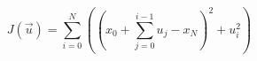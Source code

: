 \documentclass{article}
\begin{document}
\thispagestyle{empty}

$$
J(\vec{u}) = \sum\limits_{i=0}^N \left(\left(x_0+\sum\limits_{j=0}^{i-1}u_j-x_N\right)^2 + u_i^2\right)
$$
\end{document}
